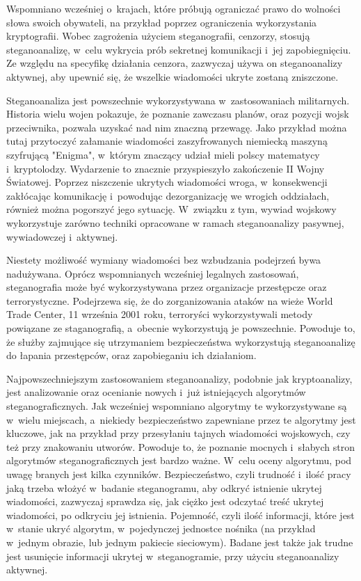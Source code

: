 \documentclass[a4paper, twoside, 12pt]{report}
\begin{document}
        Wspomniano wcześniej o~krajach, które próbują ograniczać
        prawo do wolności słowa swoich obywateli, na przykład poprzez ograniczenia
        wykorzystania kryptografii. Wobec zagrożenia użyciem steganografii, cenzorzy,
        stosują steganoanalizę, w~celu wykrycia prób sekretnej komunikacji i~jej zapobiegnięciu.
        Ze względu na specyfikę działania cenzora, zazwyczaj używa on steganoanalizy
        aktywnej, aby upewnić się, że wszelkie wiadomości ukryte zostaną zniszczone.

        Steganoanaliza jest powszechnie wykorzystywana w~zastosowaniach militarnych.
        Historia wielu wojen pokazuje, że poznanie zawczasu planów, oraz pozycji
        wojsk przeciwnika, pozwala uzyskać nad nim znaczną przewagę. Jako przykład
        można tutaj przytoczyć załamanie wiadomości zaszyfrowanych niemiecką maszyną
        szyfrującą "Enigma", w~którym znaczący udział mieli polscy matematycy i~kryptolodzy.
        Wydarzenie to znacznie przyspieszyło zakończenie II Wojny Światowej. Poprzez niszczenie ukrytych wiadomości wroga,
        w~konsekwencji zakłócając komunikację i~powodując dezorganizację we wrogich oddziałach,
        również można pogorszyć jego sytuację.
        W~związku z tym, wywiad wojskowy wykorzystuje zarówno techniki opracowane w
        ramach steganoanalizy pasywnej, wywiadowczej i~aktywnej.

        Niestety możliwość wymiany wiadomości bez wzbudzania podejrzeń bywa nadużywana.
        Oprócz wspomnianych wcześniej legalnych zastosowań, steganografia może
        być wykorzystywana przez organizacje przestępcze oraz terrorystyczne. Podejrzewa
        się, że do zorganizowania ataków na wieże World Trade Center, 11 września 2001 roku,
        terroryści wykorzystywali metody powiązane ze staganografią, a~obecnie wykorzystują
        je powszechnie\cite{TERRORISMANDSTEGANOGRAPHY}.
        Powoduje to, że służby zajmujące się utrzymaniem bezpieczeństwa wykorzystują
        steganoanalizę do łapania przestępców, oraz zapobieganiu ich działaniom.

        Najpowszechniejszym zastosowaniem steganoanalizy, podobnie jak kryptoanalizy,
        jest analizowanie oraz ocenianie nowych i~już istniejących algorytmów steganograficznych.
        Jak wcześniej wspomniano algorytmy te wykorzystywane są w~wielu miejscach,
        a~niekiedy bezpieczeństwo zapewniane przez te algorytmy jest kluczowe, jak
        na przykład przy przesyłaniu tajnych wiadomości wojskowych, czy też przy znakowaniu
        utworów. Powoduje to, że poznanie mocnych i~słabych stron algorytmów steganograficznych
        jest bardzo ważne. W~celu oceny algorytmu, pod uwagę branych jest kilka czynników.
        Bezpieczeństwo, czyli trudność i~ilość pracy jaką trzeba włożyć
        w~badanie steganogramu, aby odkryć istnienie ukrytej wiadomości,
        zazwyczaj sprawdza się, jak ciężko
        jest odczytać treść ukrytej wiadomości, po odkryciu jej istnienia.
        Pojemność, czyli
        ilość informacji, które jest w~stanie ukryć algorytm, w~pojedynczej jednostce
        nośnika (na przykład w~jednym obrazie, lub jednym pakiecie sieciowym). Badane
        jest także jak trudne jest usunięcie informacji ukrytej w~steganogramie, przy
        użyciu steganoanalizy aktywnej.
\end{document}
